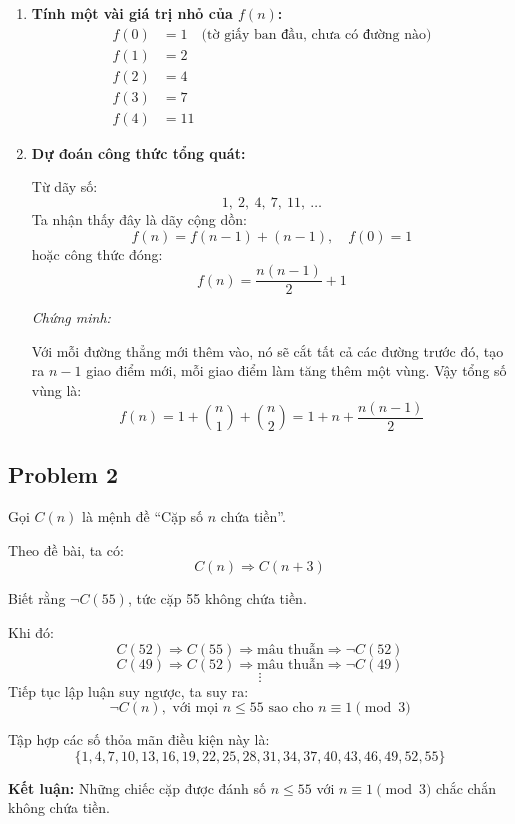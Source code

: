 \documentclass{article}
\begin{document}
	\begin{enumerate}[label=(\alph*)]
		\item \textbf{Tính một vài giá trị nhỏ của \( f(n) \):}
		\[
		\begin{aligned}
			f(0) &= 1 \quad \text{(tờ giấy ban đầu, chưa có đường nào)} \\
			f(1) &= 2 \\
			f(2) &= 4 \\
			f(3) &= 7 \\
			f(4) &= 11
		\end{aligned}
		\]
		
		\item \textbf{Dự đoán công thức tổng quát:}
		
		Từ dãy số:
		\[
		1,\ 2,\ 4,\ 7,\ 11,\ \ldots
		\]
		Ta nhận thấy đây là dãy cộng dồn:
		\[
		f(n) = f(n-1) + (n-1), \quad f(0) = 1
		\]
		hoặc công thức đóng:
		\[
		f(n) = \frac{n(n-1)}{2} + 1
		\]
		
		\textit{Chứng minh:}
		
		Với mỗi đường thẳng mới thêm vào, nó sẽ cắt tất cả các đường trước đó, tạo ra \(n-1\) giao điểm mới, mỗi giao điểm làm tăng thêm một vùng. Vậy tổng số vùng là:
		\[
		f(n) = 1 + \binom{n}{1} + \binom{n}{2} = 1 + n + \frac{n(n-1)}{2}
		\]
		
	\end{enumerate}
	
	\subsection*{Problem 2}
	Gọi \( C(n) \) là mệnh đề ``Cặp số \( n \) chứa tiền''.
	
	Theo đề bài, ta có:
	\[
	C(n) \Rightarrow C(n+3)
	\]
	
	Biết rằng \( \neg C(55) \), tức cặp 55 không chứa tiền.
	
	Khi đó:
	\[
	C(52) \Rightarrow C(55) \Rightarrow \text{mâu thuẫn} \Rightarrow \neg C(52)
	\]
	\[
	C(49) \Rightarrow C(52) \Rightarrow \text{mâu thuẫn} \Rightarrow \neg C(49)
	\]
	\[
	\vdots
	\]
	Tiếp tục lập luận suy ngược, ta suy ra:
	\[
	\neg C(n), \text{ với mọi } n \leq 55 \text{ sao cho } n \equiv 1 \pmod{3}
	\]
	
	Tập hợp các số thỏa mãn điều kiện này là:
	\[
	\{1, 4, 7, 10, 13, 16, 19, 22, 25, 28, 31, 34, 37, 40, 43, 46, 49, 52, 55\}
	\]
	
	\textbf{Kết luận:} Những chiếc cặp được đánh số \( n \leq 55 \) với \( n \equiv 1 \pmod{3} \) chắc chắn không chứa tiền.
	
\end{document}
